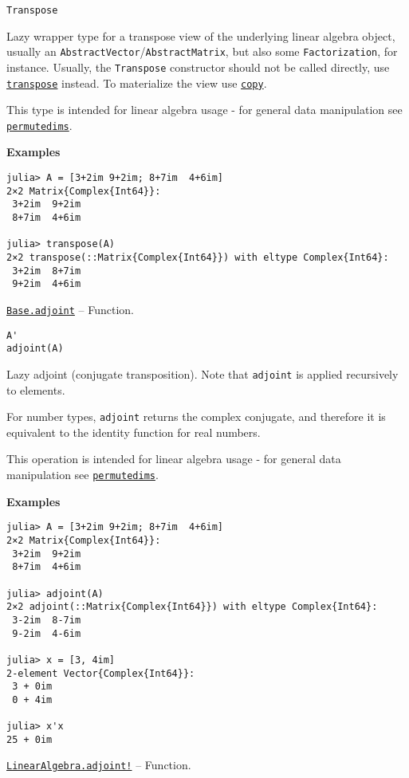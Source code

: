 \begin{adjustwidth}{2em}{0pt}


\begin{verbatim}
Transpose
\end{verbatim}

Lazy wrapper type for a transpose view of the underlying linear algebra object, usually an \texttt{AbstractVector}/\texttt{AbstractMatrix}, but also some \texttt{Factorization}, for instance. Usually, the \texttt{Transpose} constructor should not be called directly, use \hyperlink{12700837529519091997}{\texttt{transpose}} instead. To materialize the view use \hyperlink{15665284441316555522}{\texttt{copy}}.

This type is intended for linear algebra usage - for general data manipulation see \hyperlink{10913801624539723467}{\texttt{permutedims}}.

\textbf{Examples}


\begin{verbatim}
julia> A = [3+2im 9+2im; 8+7im  4+6im]
2×2 Matrix{Complex{Int64}}:
 3+2im  9+2im
 8+7im  4+6im

julia> transpose(A)
2×2 transpose(::Matrix{Complex{Int64}}) with eltype Complex{Int64}:
 3+2im  8+7im
 9+2im  4+6im
\end{verbatim}



\end{adjustwidth}
\hypertarget{10565518144285607255}{}
\hyperlink{10565518144285607255}{\texttt{Base.adjoint}}  -- {Function.}

\begin{adjustwidth}{2em}{0pt}


\begin{verbatim}
A'
adjoint(A)
\end{verbatim}

Lazy adjoint (conjugate transposition). Note that \texttt{adjoint} is applied recursively to elements.

For number types, \texttt{adjoint} returns the complex conjugate, and therefore it is equivalent to the identity function for real numbers.

This operation is intended for linear algebra usage - for general data manipulation see \hyperlink{10913801624539723467}{\texttt{permutedims}}.

\textbf{Examples}


\begin{verbatim}
julia> A = [3+2im 9+2im; 8+7im  4+6im]
2×2 Matrix{Complex{Int64}}:
 3+2im  9+2im
 8+7im  4+6im

julia> adjoint(A)
2×2 adjoint(::Matrix{Complex{Int64}}) with eltype Complex{Int64}:
 3-2im  8-7im
 9-2im  4-6im

julia> x = [3, 4im]
2-element Vector{Complex{Int64}}:
 3 + 0im
 0 + 4im

julia> x'x
25 + 0im
\end{verbatim}



\end{adjustwidth}
\hypertarget{9871500626629337445}{}
\hyperlink{9871500626629337445}{\texttt{LinearAlgebra.adjoint!}}  -- {Function.}

